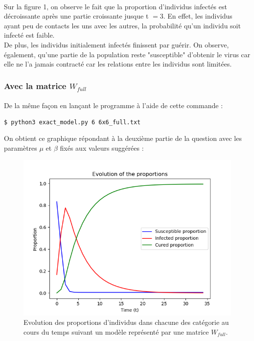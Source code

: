 \documentclass[a4paper, 12pt, oneside]{article}
\begin{document}
\paragraph{}Sur la figure 1, on observe le fait que la proportion d'individus infectés est décroissante après une partie croissante jusque t $= 3$. En effet, les individus ayant peu de contacts les uns avec les autres, la probabilité qu'un individu soit infecté est faible.\\
De plus, les individus initialement infectés finissent par guérir. On observe, également, qu'une partie de la population reste "susceptible" d'obtenir le virus car elle ne l'a jamais contracté car les relations entre les individus sont limitées.

\subsubsection{Avec la matrice $W_{full}$}

\paragraph{}De la même façon en lançant le programme à l'aide de cette commande :
\begin{lstlisting}[language=bash]
$ python3 exact_model.py 6 6x6_full.txt
\end{lstlisting}

\noindent On obtient ce graphique répondant à la deuxième partie de la question avec les paramètres $\mu$ et $\beta$ fixés aux valeurs suggérées : 

\begin{figure}[H]
	\centering
	\includegraphics[scale=1]{full_6x6.png} 
	\caption{Evolution des proportions d'individus dans chacune des catégorie au cours du temps suivant un modèle représenté par une matrice $W_{full}$.}
\end{figure}
\end{document}
